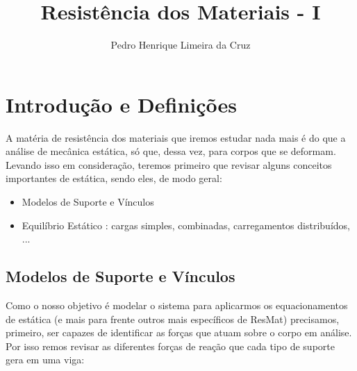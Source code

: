 \documentclass{article}
\author{Pedro Henrique Limeira da Cruz}
\title{Resistência dos Materiais - I}
\begin{document}
\maketitle
\thispagestyle{empty}


\newpage
\tableofcontents
\newpage

\section{Introdução e Definições}

A matéria de resistência dos materiais que iremos estudar nada mais é do que a análise de mecânica estática, só que, dessa vez, para corpos que se deformam.
Levando isso em consideração, teremos primeiro que revisar alguns conceitos importantes de estática, sendo eles, de modo geral:
\begin{itemize}
    \item Modelos de Suporte e Vínculos
    \item Equilíbrio Estático : cargas simples, combinadas, carregamentos distribuídos, ...
\end{itemize}

\subsection{Modelos de Suporte e Vínculos}

Como o nosso objetivo é modelar o sistema para aplicarmos os equacionamentos de estática (e mais para frente outros mais específicos de ResMat) precisamos, primeiro, ser capazes de
identificar as forças que atuam sobre o corpo em análise. Por isso remos revisar as diferentes forças de reação que cada tipo de suporte gera em uma viga:
\end{document}
